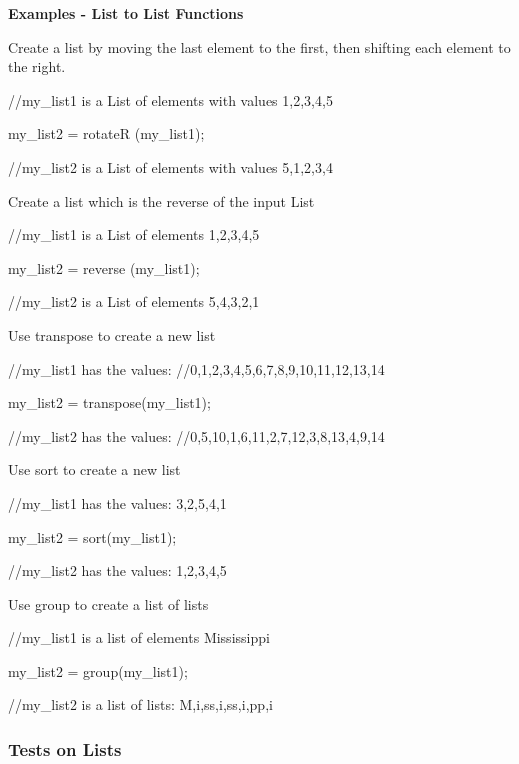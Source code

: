{\bf Examples - List to List Functions}

Create a list by moving the last element to the first, then shifting
each element to the right.

\begin{libverbatim}
     //my_list1 is a List of elements with values {1,2,3,4,5}

     my_list2 = rotateR (my_list1);

     //my_list2 is a List of elements with values {5,1,2,3,4}
\end{libverbatim}

Create a list which is the reverse of the input List
\begin{libverbatim}
     //my_list1 is a List of elements {1,2,3,4,5}

     my_list2 = reverse (my_list1);

     //my_list2 is a List of elements {5,4,3,2,1}
\end{libverbatim}

Use transpose to create a new list
\begin{libverbatim}
     //my_list1 has the values:
     //{{0,1,2,3,4},{5,6,7,8,9},{10,11,12,13,14}}

     my_list2 = transpose(my_list1);

     //my_list2 has the values:
     //{{0,5,10},{1,6,11},{2,7,12},{3,8,13},{4,9,14}}
\end{libverbatim}

Use sort to create a new list
\begin{libverbatim}
     //my_list1 has the values: {3,2,5,4,1}

     my_list2 = sort(my_list1);

     //my_list2 has the values: {1,2,3,4,5}
\end{libverbatim}

Use group to create a list of lists
\begin{libverbatim}
     //my_list1 is a list of elements {Mississippi}

     my_list2 = group(my_list1);

     //my_list2 is a list of lists:
     {{M},{i},{ss},{i},{ss},{i},{pp},{i}}
\end{libverbatim}




\subsubsection{Tests on Lists}


